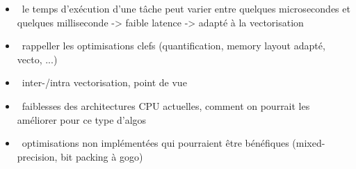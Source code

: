 \begin{itemize}
  \item \xmark~le temps d’exécution d’une tâche peut varier entre quelques
    microsecondes et quelques milliseconde -> faible latence -> adapté à la
    vectorisation
  \item \xmark~rappeller les optimisations clefs (quantification, memory layout
    adapté, vecto, ...)
  \item \xmark~inter-/intra vectorisation, point de vue
  \item \xmark~faiblesses des architectures CPU actuelles, comment on pourrait
    les améliorer pour ce type d'algos
  \item \xmark~optimisations non implémentées qui pourraient être bénéfiques
    (mixed-precision, bit packing à gogo)
\end{itemize}